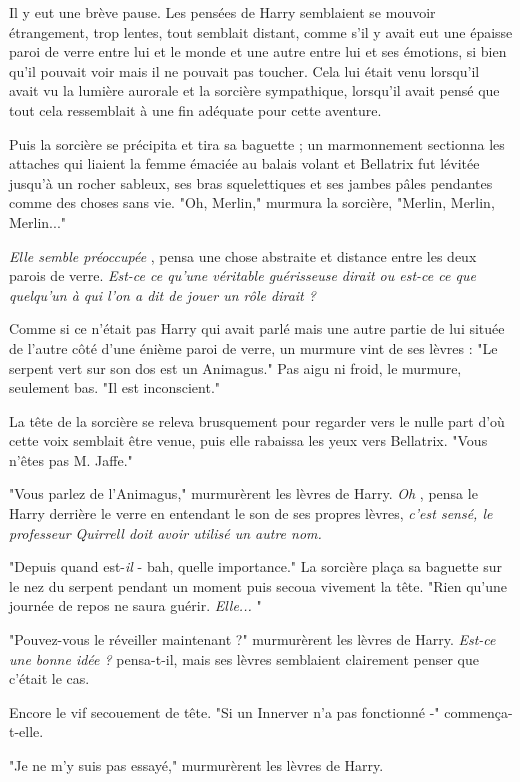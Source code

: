 Il y eut une brève pause. Les pensées de Harry semblaient se mouvoir étrangement, trop lentes, tout semblait distant, comme s'il y avait eut une épaisse paroi de verre entre lui et le monde et une autre entre lui et ses émotions, si bien qu'il pouvait voir mais il ne pouvait pas toucher. Cela lui était venu lorsqu'il avait vu la lumière aurorale et la sorcière sympathique, lorsqu'il avait pensé que tout cela ressemblait à une fin adéquate pour cette aventure.

Puis la sorcière se précipita et tira sa baguette ; un marmonnement sectionna les attaches qui liaient la femme émaciée au balais volant et Bellatrix fut lévitée jusqu'à un rocher sableux, ses bras squelettiques et ses jambes pâles pendantes comme des choses sans vie. "Oh, Merlin," murmura la sorcière, "Merlin, Merlin, Merlin..."

\emph{Elle semble préoccupée} , pensa une chose abstraite et distance entre les deux parois de verre. \emph{Est-ce ce qu'une véritable guérisseuse dirait ou est-ce ce que quelqu'un à qui l'on a dit de jouer un rôle dirait ?} 

Comme si ce n'était pas Harry qui avait parlé mais une autre partie de lui située de l'autre côté d'une énième paroi de verre, un murmure vint de ses lèvres : "Le serpent vert sur son dos est un Animagus." Pas aigu ni froid, le murmure, seulement bas. "Il est inconscient."

La tête de la sorcière se releva brusquement pour regarder vers le nulle part d'où cette voix semblait être venue, puis elle rabaissa les yeux vers Bellatrix. "Vous n'êtes pas M. Jaffe."

"Vous parlez de l'Animagus," murmurèrent les lèvres de Harry. \emph{Oh} , pensa le Harry derrière le verre en entendant le son de ses propres lèvres, \emph{c'est sensé, le professeur Quirrell doit avoir utilisé un autre nom.} 

"Depuis quand est-\emph{il}  - bah, quelle importance." La sorcière plaça sa baguette sur le nez du serpent pendant un moment puis secoua vivement la tête. "Rien qu'une journée de repos ne saura guérir. \emph{Elle...} "

"Pouvez-vous le réveiller maintenant ?" murmurèrent les lèvres de Harry. \emph{Est-ce une bonne idée ?}  pensa-t-il, mais ses lèvres semblaient clairement penser que c'était le cas.

Encore le vif secouement de tête. "Si un Innerver n'a pas fonctionné -" commença-t-elle.

"Je ne m'y suis pas essayé," murmurèrent les lèvres de Harry.

